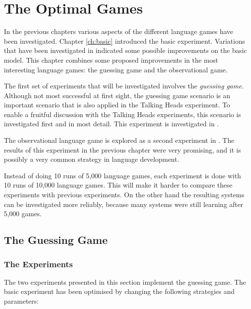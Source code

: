 \chapter{The Optimal Games}\label{ch:opt}

In the previous chapters various aspects of the different language games have been investigated. Chapter \ref{ch:basic} introduced the basic experiment. Variations that have been investigated in  indicated some possible improvements on the basic model. This chapter combines some proposed improvements in the most interesting language games: the guessing game and the observational game.

The first set of experiments that will be investigated involves the {\em guessing game}. Although not most successful at first sight, the guessing game scenario is an important scenario that is also applied in the Talking Heads experiment. To enable a fruitful discussion with the Talking Heads experiments, this scenario is investigated first and in most detail. This experiment is investigated in .

The observational language game is explored as a second experiment in . The results of this experiment in the previous chapter were very promising, and it is possibly a very common strategy in language development.


  Instead of doing 10 runs of 5,000 language games, each experiment is done with 10 runs of 10,000 language games. This will make it harder to compare these experiments with previous experiments. On the other hand the resulting systems can be investigated more reliably, because many systems were still learning after 5,000 games. 


\section{The Guessing Game}\label{s:opt:gg}

\subsection{The Experiments}

The two experiments presented in this section implement the guessing game. The basic experiment has been optimised by changing the following strategies and parameters:


